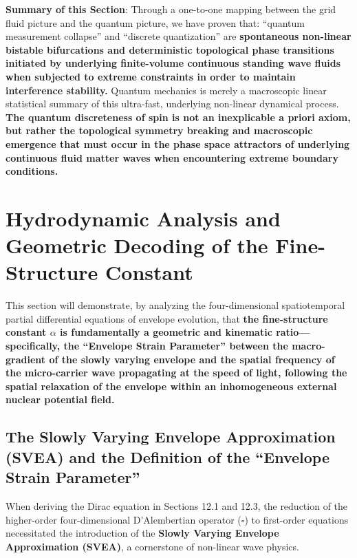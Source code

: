 \documentclass[12pt, a4paper]{article}
\begin{document}
\textbf{Summary of this Section}: Through a one-to-one mapping between the grid fluid picture and the quantum picture, we have proven that: ``quantum measurement collapse'' and ``discrete quantization'' are \textbf{spontaneous non-linear bistable bifurcations and deterministic topological phase transitions initiated by underlying finite-volume continuous standing wave fluids when subjected to extreme constraints in order to maintain interference stability.} Quantum mechanics is merely a macroscopic linear statistical summary of this ultra-fast, underlying non-linear dynamical process. \textbf{The quantum discreteness of spin is not an inexplicable a priori axiom, but rather the topological symmetry breaking and macroscopic emergence that must occur in the phase space attractors of underlying continuous fluid matter waves when encountering extreme boundary conditions.}








\section{Hydrodynamic Analysis and Geometric Decoding of the Fine-Structure Constant}

This section will demonstrate, by analyzing the four-dimensional spatiotemporal partial differential equations of envelope evolution, that \textbf{the fine-structure constant $\alpha$ is fundamentally a geometric and kinematic ratio---specifically, the ``Envelope Strain Parameter'' between the macro-gradient of the slowly varying envelope and the spatial frequency of the micro-carrier wave propagating at the speed of light, following the spatial relaxation of the envelope within an inhomogeneous external nuclear potential field.}

\subsection{The Slowly Varying Envelope Approximation (SVEA) and the Definition of the ``Envelope Strain Parameter''}

When deriving the Dirac equation in Sections 12.1 and 12.3, the reduction of the higher-order four-dimensional D'Alembertian operator ($\square$) to first-order equations necessitated the introduction of the \textbf{Slowly Varying Envelope Approximation (SVEA)}, a cornerstone of non-linear wave physics.
\end{document}
